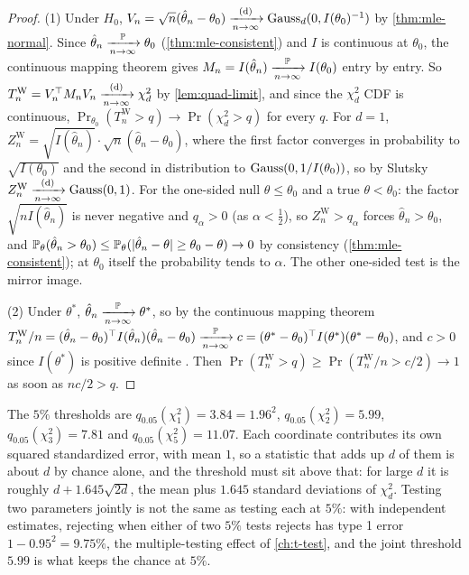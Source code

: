 \begin{proof}
(1) Under $H_0$, $V_n = \sqrt{n}(\hat{\theta}_n - \theta_0) \xrightarrow [n \to \infty ]{\text{(d)}} \text{Gauss}_d(0, I(\theta_0)^{-1})$ by \cref{thm:mle-normal}.
Since $\hat{\theta}_n \xrightarrow [n \to \infty ]{\mathbb{P}} \theta_0$ (\cref{thm:mle-consistent}) and $I$ is continuous at $\theta_0$, the continuous mapping theorem gives $M_n = I(\hat{\theta}_n) \xrightarrow [n \to \infty ]{\mathbb{P}} I(\theta_0)$ entry by entry.
So $T^{\mathrm{W}}_n = V_n^\top M_n V_n \xrightarrow [n \to \infty ]{\text{(d)}} \chi^2_d$ by \cref{lem:quad-limit}, and since the $\chi^2_d$ CDF is continuous, $\Pr_{\theta_0}(T^{\mathrm{W}}_n > q) \to \Pr(\chi^2_d > q)$ for every $q$.
For $d = 1$, $Z^{\mathrm{W}}_n = \sqrt{I(\hat{\theta}_n)}\cdot\sqrt{n}(\hat{\theta}_n - \theta_0)$, where the first factor converges in probability to $\sqrt{I(\theta_0)}$ and the second in distribution to $\text{Gauss}(0, 1/I(\theta_0))$, so by Slutsky $Z^{\mathrm{W}}_n \xrightarrow [n \to \infty ]{\text{(d)}} \text{Gauss}(0, 1)$.
For the one-sided null $\theta \leq \theta_0$ and a true $\theta < \theta_0$: the factor $\sqrt{nI(\hat{\theta}_n)}$ is never negative and $q_\alpha > 0$ (as $\alpha < \frac12$), so $Z^{\mathrm{W}}_n > q_\alpha$ forces $\hat{\theta}_n > \theta_0$, and $\mathbb{P}_\theta(\hat{\theta}_n > \theta_0) \leq \mathbb{P}_\theta(\lvert\hat{\theta}_n - \theta\rvert \geq \theta_0 - \theta) \to 0$ by consistency (\cref{thm:mle-consistent}); at $\theta_0$ itself the probability tends to $\alpha$.
The other one-sided test is the mirror image.

(2) Under $\theta^*$, $\hat{\theta}_n \xrightarrow [n \to \infty ]{\mathbb{P}} \theta^*$, so by the continuous mapping theorem $T^{\mathrm{W}}_n/n = (\hat{\theta}_n - \theta_0)^\top I(\hat{\theta}_n)(\hat{\theta}_n - \theta_0) \xrightarrow [n \to \infty ]{\mathbb{P}} c = (\theta^* - \theta_0)^\top I(\theta^*)(\theta^* - \theta_0)$, and $c > 0$ since $I(\theta^*)$ is positive definite .
Then $\Pr(T^{\mathrm{W}}_n > q) \geq \Pr(T^{\mathrm{W}}_n/n > c/2) \to 1$ as soon as $nc/2 > q$.
\end{proof}

\begin{sanitycheck}
The $5\%$ thresholds are $q_{0.05}(\chi^2_1) = 3.84 = 1.96^2$, $q_{0.05}(\chi^2_2) = 5.99$, $q_{0.05}(\chi^2_3) = 7.81$ and $q_{0.05}(\chi^2_5) = 11.07$.
Each coordinate contributes its own squared standardized error, with mean $1$, so a statistic that adds up $d$ of them is about $d$ by chance alone, and the threshold must sit above that: for large $d$ it is roughly $d + 1.645\sqrt{2d}$, the mean plus $1.645$ standard deviations of $\chi^2_d$.
Testing two parameters jointly is not the same as testing each at $5\%$: with independent estimates, rejecting when either of two $5\%$ tests rejects has type 1 error $1 - 0.95^2 = 9.75\%$, the multiple-testing effect of \cref{ch:t-test}, and the joint threshold $5.99$ is what keeps the chance at $5\%$.
\end{sanitycheck}

